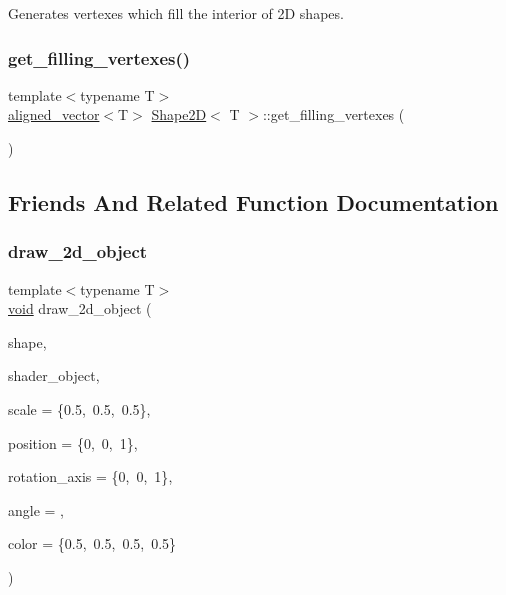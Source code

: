 Generates vertexes which fill the interior of 2D shapes. 

\mbox{\label{classShape2D_af67c7aed6e58b5aa0e3518a3ad1de75b}} 
\subsubsection{\texorpdfstring{get\+\_\+filling\+\_\+vertexes()}{get\_filling\_vertexes()}}
{\footnotesize\ttfamily template$<$typename T$>$ \\
\mbox{\hyperlink{type__definitions_8hpp_a087efd587d66b881646ef378f1919c90}{aligned\+\_\+vector}}$<$T$>$ \mbox{\hyperlink{classShape2D}{Shape2D}}$<$ T $>$\+::get\+\_\+filling\+\_\+vertexes (\begin{DoxyParamCaption}{ }\end{DoxyParamCaption})\hspace{0.3cm}{\ttfamily [inline]}}



\subsection{Friends And Related Function Documentation}
\mbox{\label{classShape2D_a75ed525e537ded17d42e3adad87bd701}} 
\subsubsection{\texorpdfstring{draw\+\_\+2d\+\_\+object}{draw\_2d\_object}}
{\footnotesize\ttfamily template$<$typename T$>$ \\
\mbox{\hyperlink{glad_8h_a950fc91edb4504f62f1c577bf4727c29}{void}} draw\+\_\+2d\+\_\+object (\begin{DoxyParamCaption}\item[{\mbox{\hyperlink{classShape2D}{Shape2D}}$<$ T $>$ \&}]{shape,  }\item[{\mbox{\hyperlink{classShader}{Shader}}$<$ \mbox{\hyperlink{shader__class_8hpp_a24e288e18eb7b6e01de7565001fedb60aa98862073f71a928bad5099cc3e1c2ed}{R\+E\+N\+D\+E\+R\+\_\+\+T\+Y\+P\+E\+::\+U\+N\+I\+F\+O\+R\+M\+\_\+\+C\+O\+L\+OR}} $>$ \&}]{shader\+\_\+object,  }\item[{std\+::array$<$ float, 3 $>$}]{scale = {\ttfamily \{0.5,~0.5,~0.5\}},  }\item[{std\+::array$<$ float, 3 $>$}]{position = {\ttfamily \{0,~0,~1\}},  }\item[{std\+::array$<$ float, 3 $>$}]{rotation\+\_\+axis = {\ttfamily \{0,~0,~1\}},  }\item[{float}]{angle = {},  }\item[{glm\+::vec4}]{color = {\ttfamily \{0.5,~0.5,~0.5,~0.5\}} }\end{DoxyParamCaption})\hspace{0.3cm}{\ttfamily [friend]}}




